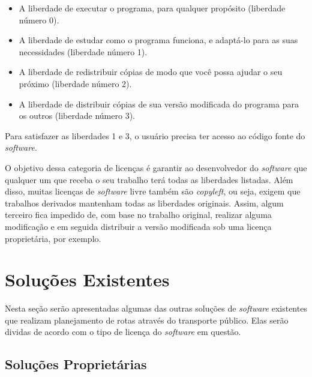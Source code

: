 \begin{itemize}

\item A liberdade de executar o programa, para qualquer propósito (liberdade número 0).
\item A liberdade de estudar como o programa funciona, e adaptá-lo para as suas necessidades (liberdade número 1).
\item A liberdade de redistribuir cópias de modo que você possa ajudar o seu próximo (liberdade número 2).
\item A liberdade de distribuir cópias de sua versão modificada do programa para os outros (liberdade número 3).

\end{itemize}

Para satisfazer as liberdades 1 e 3, o usuário precisa ter acesso ao código fonte do \emph{software}.

O objetivo dessa categoria de licenças é garantir ao desenvolvedor do \emph{software} que qualquer um que receba o seu trabalho terá todas as liberdades listadas. Além disso, muitas licenças de \emph{software} livre também são \emph{copyleft}, ou seja, exigem que trabalhos derivados mantenham todas as liberdades originais. Assim, algum terceiro fica impedido de, com base no trabalho original, realizar alguma modificação e em seguida distribuir a versão modificada sob uma licença proprietária, por exemplo.


\section{Soluções Existentes}

Nesta seção serão apresentadas algumas das outras soluções de \emph{software} existentes que realizam planejamento de rotas através do transporte público. Elas serão dividas de acordo com o tipo de licença do \emph{software} em questão.

\subsection{Soluções Proprietárias}

